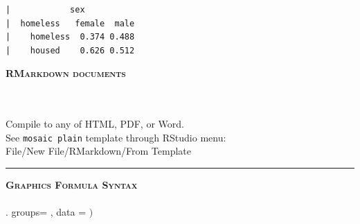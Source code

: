 \documentclass{article}\usepackage[]{graphicx}\usepackage[]{color}
\makeatletter
\newenvironment{kframe}{%
 \def\at@end@of@kframe{}%
 \ifinner\ifhmode%
  \def\at@end@of@kframe{\end{minipage}}%
  \begin{minipage}{\columnwidth}%
 \fi\fi%
 \def\FrameCommand##1{\hskip\@totalleftmargin \hskip-\fboxsep
 \colorbox{shadecolor}{##1}\hskip-\fboxsep
     \hskip-\linewidth \hskip-\@totalleftmargin \hskip\columnwidth}%
 \MakeFramed {\advance\hsize-\width
   \@totalleftmargin\z@ \linewidth\hsize
   \@setminipage}}%
 {\par\unskip\endMakeFramed%
 \at@end@of@kframe}
\newenvironment{knitrout}{}{} %
\newcommand{\Wspace}{{\tiny\color{white}.}\hfill}
\newcommand{\NewSection}[1]{{\noindent\color{blue}\bfseries\scshape#1}}
\makeatother
\begin{document}
\begin{knitrout}
\color{fgcolor}\begin{kframe}
\begin{verbatim}
|            sex
|  homeless   female  male
|    homeless  0.374 0.488
|    housed    0.626 0.512
\end{verbatim}
\end{kframe}
\end{knitrout}
\NewSection{RMarkdown documents}\\
\\
\hbox{ \hfill {}}\\
\begin{small}%
\noindent Compile to any of HTML, PDF, or Word.\\
See \texttt{mosaic plain} template through RStudio menu:\\ 
{\sc File/New File/RMarkdown/From Template}
\end{small}%

\newpage
\hrule\vspace*{1mm}%
\NewSection{Graphics Formula Syntax}\\
\\\Wspace 
  {\sf groups= , data =  $\Big)$}
\end{document}
